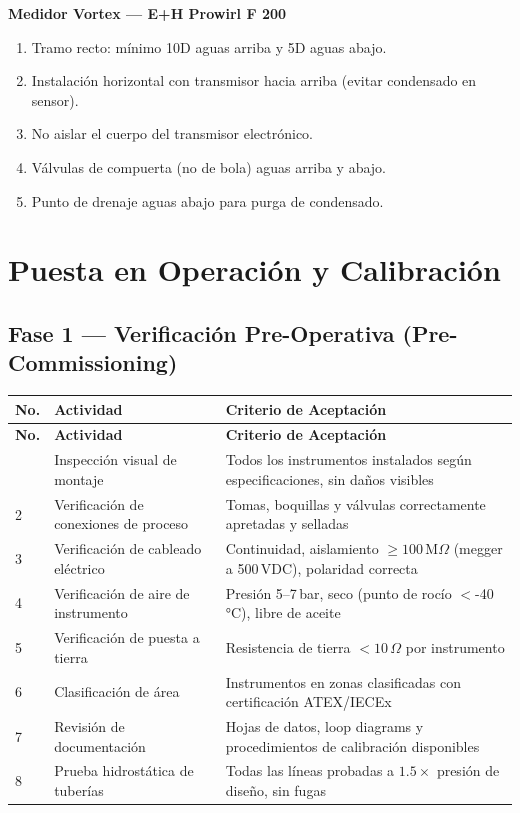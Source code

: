 \documentclass[12pt,letterpaper]{article}
\begin{document}
\textbf{Medidor Vortex — E+H Prowirl F 200}
\begin{enumerate}[leftmargin=1.5cm, label=\arabic*.]
  \item Tramo recto: mínimo 10D aguas arriba y 5D aguas abajo.
  \item Instalación horizontal con transmisor hacia arriba (evitar condensado en sensor).
  \item No aislar el cuerpo del transmisor electrónico.
  \item Válvulas de compuerta (no de bola) aguas arriba y abajo.
  \item Punto de drenaje aguas abajo para purga de condensado.
\end{enumerate}

\section{Puesta en Operación y Calibración}

\subsection{Fase 1 — Verificación Pre-Operativa (Pre-Commissioning)}

\renewcommand{\arraystretch}{1.3}
\begin{longtable}{C{0.8cm} L{5.5cm} L{8cm}}
\toprule
{}
\color{white}\textbf{No.} & \color{white}\textbf{Actividad} & \color{white}\textbf{Criterio de Aceptación} \\
\midrule
\endfirsthead
\toprule
{}
\color{white}\textbf{No.} & \color{white}\textbf{Actividad} & \color{white}\textbf{Criterio de Aceptación} \\
\midrule
\endhead
\bottomrule
{} & Inspección visual de montaje         & Todos los instrumentos instalados según especificaciones, sin daños visibles \\
2 & Verificación de conexiones de proceso & Tomas, boquillas y válvulas correctamente apretadas y selladas \\
3 & Verificación de cableado eléctrico   & Continuidad, aislamiento $\geq100\,$M$\Omega$ (megger a 500\,VDC), polaridad correcta \\
4 & Verificación de aire de instrumento  & Presión 5--7\,bar, seco (punto de rocío $<$-40\,°C), libre de aceite \\
5 & Verificación de puesta a tierra      & Resistencia de tierra $<10\,\Omega$ por instrumento \\
6 & Clasificación de área                & Instrumentos en zonas clasificadas con certificación ATEX/IECEx \\
7 & Revisión de documentación            & Hojas de datos, loop diagrams y procedimientos de calibración disponibles \\
8 & Prueba hidrostática de tuberías      & Todas las líneas probadas a $1.5\times$ presión de diseño, sin fugas \\
\bottomrule
\end{longtable}
\end{document}
